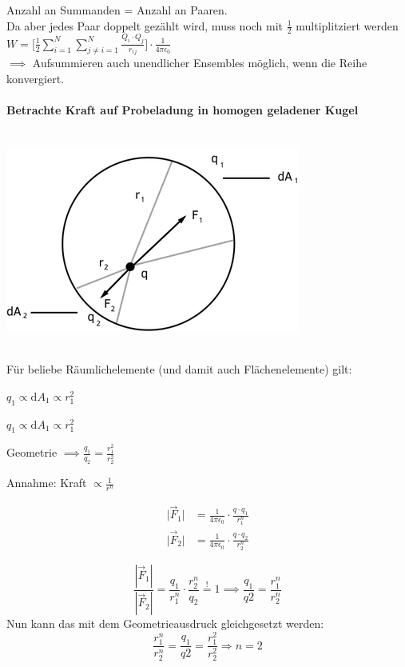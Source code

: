 \documentclass[11pt]{article}
\begin{document}
Anzahl an Summanden = Anzahl an Paaren.\\
Da aber jedes Paar doppelt gezählt wird, muss noch mit $\frac{1}{2}$ multiplitziert werden\\

$\boxed{W = \bigg[\frac{1}{2}\sum_{i=1}^{N} \sum_{j≠i=1}^{N} \frac{Q_i\cdot Q_j}{r_{ij}}\bigg]\cdot \frac{1}{4\pi\epsilon_0}}$
\\
$\implies$ Aufsummieren auch unendlicher Ensembles möglich, wenn die Reihe konvergiert. 

\paragraph{Betrachte Kraft auf Probeladung in homogen geladener Kugel}

\hfill\\

\includegraphics{skizzen/14/14_3B0}

\hfill\\

Für beliebe Räumlichelemente (und damit auch Flächenelemente) gilt:

$q_1 \propto \mathrm{d}A_1 \propto r_1^2$

$q_1 \propto \mathrm{d}A_1 \propto r_1^2$

Geometrie $\implies \frac{q_1}{q_2} = \frac{r_1^2}{r_2^2}$

Annahme: Kraft $\propto \frac{1}{r^n}$

\begin{align*}
	\vert\vec{F}_1\vert &= \frac{1}{4\pi\epsilon_0}\cdot\frac{q\cdot q_1}{r_1^n}\\
	\vert\vec{F}_2\vert &= \frac{1}{4\pi\epsilon_0}\cdot\frac{q\cdot q_2}{r_2^n}
\end{align*}

$$\frac{|\vec{F}_1|}{|\vec{F}_2|} = \frac{q_1}{r_1^n}\cdot \frac{r_2^n}{q_2} \overset{!}{=} 1 \implies \frac{q_1}{q2}=\frac{r_1^n}{r_2^n}$$
Nun kann das mit dem Geometrieausdruck gleichgesetzt werden:
$$\frac{r_1^n}{r_2^n}=\frac{q_1}{q2}=\frac{r_1^2}{r_2^2}\Rightarrow n=2$$
\end{document}
